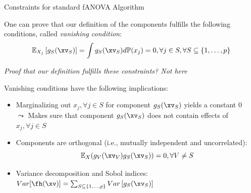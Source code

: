 \documentclass[11pt,compress,t,notes=noshow, aspectratio=169, xcolor=table]{beamer}
\begin{document}
\begin{frame}{Constraints for standard fANOVA Algorithm}

    One can prove that our definition of the components fulfills the following conditions, called \textit{vanishing condition}:
    \begin{equation*}
        \mathbb{E}_{X_j}\left[ g_{S}(\xv_S) \right] = \int g_{S}(\xv_S) d \mathbb{P}(x_j) = 0, \forall j \in S, \forall S \subseteq \{1, \ldots, p\}
    \end{equation*}


    \textit{Proof that our definition fulfills these constraints? Not here}
    
    \pause 
    
    Vanishing conditions have the following implications:
    
    \begin{itemize}
        \item Marginalizing out $x_j, \forall j \in S$ for component $g_S(\xv_S)$ yields a constant 0\\
        $\leadsto$ Makes sure that component $g_S(\xv_S)$ does not contain effects of $x_j, \forall j \in S$
        \item Components are orthogonal (i.e., mutually independent and uncorrelated):
        $$\mathbb{E}_{X} (g_{V}(\xv_V) g_{S}(\xv_S)) = 0, \forall V \neq S$$
        \item Variance decomposition and Sobol indices:
    $ Var[\fh(\xv)] =  \textstyle\sum_{S \subseteq \{1,\ldots,p\}}  Var\left[ g_{S}(\xv_S)\right]$
    \end{itemize}
    
\end{frame}
\end{document}
